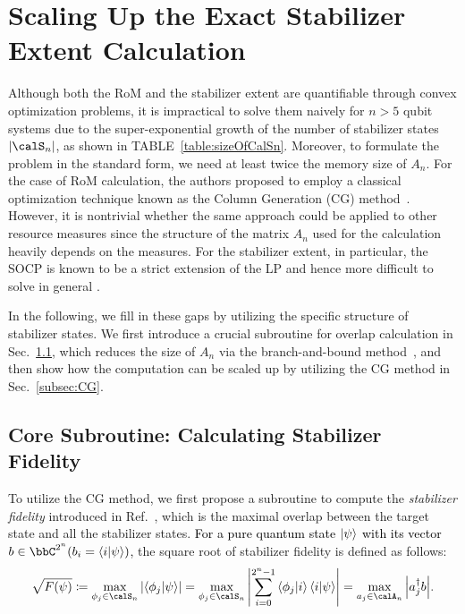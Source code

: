 \documentclass[aps,prx,onecolumn,superscriptaddress,nobibnotes,nofootinbib]{revtex4-2}
\newcommand{\black}[1]{\textcolor{black}{#1}}
\newcommand{\defeq}{\coloneqq}
\begin{document}
\section{Scaling Up the Exact Stabilizer Extent Calculation}
\label{sec:scalingUp}

Although both the RoM and the stabilizer extent are quantifiable through convex optimization problems, it is impractical to solve them naively for $n>5$ qubit systems due to the super-exponential growth of the number of stabilizer states $\abs{\calS_n}$, as shown in TABLE~\ref{table:sizeOfCalSn}.
Moreover, to formulate the problem in the standard form, we need at least twice the memory size of $A_n$.
For the case of RoM calculation, the authors proposed to employ a classical optimization technique known as the Column Generation (CG) method~\cite{Hamaguchi2024handbookquantifying}.
However, it is nontrivial whether the same approach could be applied to other resource measures since the structure of the matrix $A_n$ used for the calculation heavily depends on the measures.
For the stabilizer extent, in particular, the SOCP is known to be a strict extension of the LP and hence more difficult to solve in general \cite[Section 4.4.2]{boydConvexOptimization2004}.

In the following, we fill in these gaps by utilizing the specific structure of stabilizer states. We first introduce a crucial subroutine for overlap calculation in Sec.~\ref{sec:coreSubroutine}, which reduces the size of $A_n$ via the branch-and-bound method~\cite{Horst1990}, and then show how the computation can be scaled up by utilizing the CG method in Sec.~\ref{subsec:CG}.

\subsection{Core Subroutine: Calculating Stabilizer Fidelity}
\label{sec:coreSubroutine}

To utilize the CG method, we first propose a subroutine to compute the {\it stabilizer fidelity} introduced in Ref.~\cite{Bravyi2019simulationofquantum}, which is the maximal overlap between the target state and all the stabilizer states.
\black{For a pure quantum state $\ket{\psi}$ with its vector $b \in \bbC^{2^n} (b_i = \braket{i}{\psi})$,} the square root of stabilizer fidelity is defined as follows:
\begin{equation*}
  \sqrt{F(\psi)} \defeq \max_{\phi_j \in \calS_n} \abs{\braket{\phi_j}{\psi}}
  = \max_{\phi_j \in \calS_n} \abs{\sum_{i=0}^{2^n-1} \braket{\phi_j}{i}\braket{i}{\psi}}
  = \max_{a_j \in \calA_n} \abs{a_j^\dagger b}.
\end{equation*}
\end{document}
